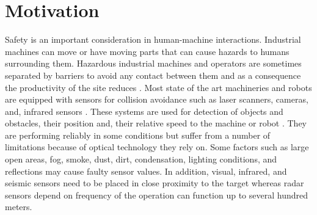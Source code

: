 \section{Motivation}
Safety is an important consideration in human-machine interactions. Industrial machines can move or have moving parts that can cause hazards to humans surrounding them. Hazardous industrial machines and operators are sometimes separated by barriers to avoid any contact between them and as a consequence the productivity of the site reduces \cite{AutomotiveRadarPatole}. Most state of the art machineries and robots are equipped with sensors for collision avoidance such as laser scanners, cameras, and, infrared sensors \cite{RadarColaborativeRobotZlatanski}. These systems are used for detection of objects and obstacles, their position and, their relative speed to the machine or robot \cite{AutomotiveRadarPatole}. They are performing reliably in some conditions but suffer from a number of limitations because of optical technology they rely on. Some factors such as large open areas, fog, smoke, dust, dirt, condensation, lighting conditions, and reflections may cause faulty sensor values. In addition, visual, infrared, and seismic sensors need to be placed in close proximity to the target whereas radar sensors depend on frequency of the operation can function up to several hundred meters.




